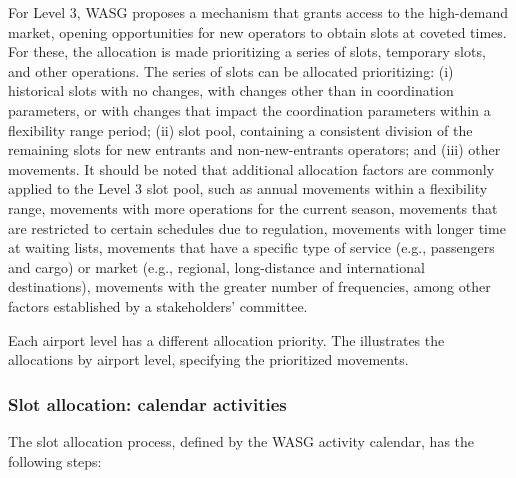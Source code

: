 For Level 3, \acrshort{WASG} proposes a mechanism that grants access to the high-demand market, opening opportunities for new operators to obtain slots at coveted times. For these, the allocation is made prioritizing a series of slots, temporary slots, and other operations. The series of slots can be allocated prioritizing: (i) historical slots with no changes, with changes other than in coordination parameters, or with changes that impact the coordination parameters within a flexibility range period; (ii) slot pool, containing a consistent division of the remaining slots for new entrants and non-new-entrants operators; and (iii) other movements. It should be noted that additional allocation factors are commonly applied to the Level 3 slot pool, such as annual movements within a flexibility range, movements with more operations for the current season, movements that are restricted to certain schedules due to regulation, movements with longer time at waiting lists, movements that have a specific type of service (e.g., passengers and cargo) or market (e.g., regional, long-distance and international destinations), movements with the greater number of frequencies, among other factors established by a stakeholders' committee.

Each airport level has a different allocation priority. The  illustrates the allocations by airport level, specifying the prioritized movements.

%

\subsubsection{Slot allocation: calendar activities}

The slot allocation process, defined by the \acrshort{WASG} activity calendar, has the following steps: 

